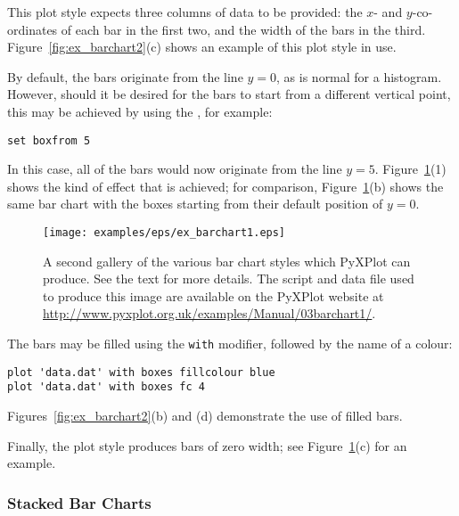 \noindent This plot style expects three columns of data to be provided: the
$x$- and $y$-co-ordinates of each bar in the first two, and the width of the
bars in the third.  Figure~\ref{fig:ex_barchart2}(c) shows an example of this
plot style in use.

By default, the bars originate from the line $y=0$, as is normal for a
histogram. However, should it be desired for the bars to start from a different
vertical point, this may be achieved by using the ,
for example:

\begin{verbatim}
set boxfrom 5
\end{verbatim}

\noindent In this case, all of the bars would now originate from the line
$y=5$. Figure~\ref{fig:ex_barchart1}(1) shows the kind of effect that is
achieved; for comparison, Figure~\ref{fig:ex_barchart1}(b) shows the same bar
chart with the boxes starting from their default position of $y=0$.

\begin{figure}
\begin{center}
\texttt{[image: examples/eps/ex\_barchart1.eps]}
\end{center}
\caption[A second gallery of the various bar chart styles which PyXPlot can
produce]
{A second gallery of the various bar chart styles which PyXPlot can
produce. See the text for more details.  The script and data file used to
produce this image are available on the PyXPlot website at
\protect\url{http://www.pyxplot.org.uk/examples/Manual/03barchart1/}.}
\label{fig:ex_barchart1}
\end{figure}

The bars may be filled using the {\tt with}  modifier,
followed by the name of a colour:

\begin{verbatim}
plot 'data.dat' with boxes fillcolour blue
plot 'data.dat' with boxes fc 4
\end{verbatim}

\noindent Figures~\ref{fig:ex_barchart2}(b) and (d) demonstrate the use of
filled bars.

Finally, the  plot style produces bars of zero width; see
Figure~\ref{fig:ex_barchart1}(c) for an example.

\subsubsection{Stacked Bar Charts}


